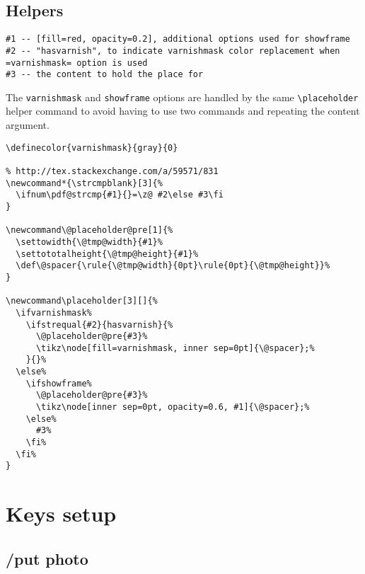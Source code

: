 \documentclass[11pt,oneside]{memoir-article}
\begin{document}
\section{Helpers}
\label{sec-6-7}

\begin{verbatim}
#1 -- [fill=red, opacity=0.2], additional options used for showframe
#2 -- "hasvarnish", to indicate varnishmask color replacement when =varnishmask= option is used
#3 -- the content to hold the place for
\end{verbatim}

The \texttt{varnishmask} and \texttt{showframe} options are handled by the same \texttt{\textbackslash{}placeholder}
helper command to avoid having to use two commands and repeating the content
argument.

\begin{verbatim}
\definecolor{varnishmask}{gray}{0}

% http://tex.stackexchange.com/a/59571/831
\newcommand*{\strcmpblank}[3]{%
  \ifnum\pdf@strcmp{#1}{}=\z@ #2\else #3\fi
}

\newcommand\@placeholder@pre[1]{%
  \settowidth{\@tmp@width}{#1}%
  \settototalheight{\@tmp@height}{#1}%
  \def\@spacer{\rule{\@tmp@width}{0pt}\rule{0pt}{\@tmp@height}}%
}

\newcommand\placeholder[3][]{%
  \ifvarnishmask%
    \ifstrequal{#2}{hasvarnish}{%
      \@placeholder@pre{#3}%
      \tikz\node[fill=varnishmask, inner sep=0pt]{\@spacer};%
    }{}%
  \else%
    \ifshowframe%
      \@placeholder@pre{#3}%
      \tikz\node[inner sep=0pt, opacity=0.6, #1]{\@spacer};%
    \else%
      #3%
    \fi%
  \fi%
}
\end{verbatim}

\chapter{Keys setup}
\label{sec-7}
\section{/put photo}
\label{sec-7-1}
\end{document}
